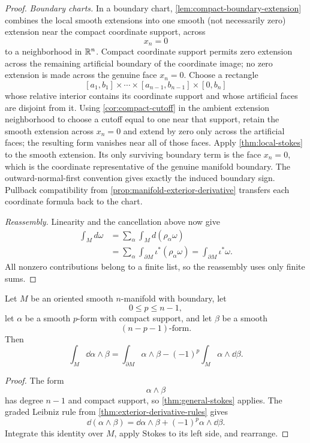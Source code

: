 \begin{proof}
\emph{Boundary charts.} In a boundary chart, \cref{lem:compact-boundary-extension}
combines the local smooth extensions into one smooth (not necessarily zero)
extension near the compact coordinate support, across
\[
x_n=0
\]
to a neighborhood in \(\mathbb{R}^n\).  Compact coordinate support permits zero
extension across the remaining artificial boundary of the coordinate image;
no zero extension is made across the genuine face \(x_n=0\).  Choose a
rectangle
\[
[a_1,b_1]\times\cdots\times[a_{n-1},b_{n-1}]\times[0,b_n]
\]
whose relative interior contains its coordinate support and whose artificial
faces are disjoint from it.  Using \cref{cor:compact-cutoff} in the ambient extension neighborhood to choose a cutoff equal to one near that support,
retain the smooth extension across \(x_n=0\) and extend by zero only across the
artificial faces; the resulting form vanishes near all of those faces.  Apply
\cref{thm:local-stokes} to the smooth extension.  Its only surviving boundary
term is the face \(x_n=0\), which is the coordinate representative of the
genuine manifold boundary.  The outward-normal-first convention gives
exactly the induced boundary sign.  Pullback compatibility
from \cref{prop:manifold-exterior-derivative} transfers each coordinate formula
back to the chart.

\emph{Reassembly.} Linearity and the cancellation above now give
\[
\begin{aligned}
\int_M d\omega
&=\sum_\alpha\int_M d(\rho_\alpha\omega)\\
&=\sum_\alpha\int_{\partial M}\iota^*(\rho_\alpha\omega)
=\int_{\partial M}\iota^*\omega.
\end{aligned}
\]
All nonzero contributions belong to a finite list, so the reassembly uses
only finite sums.
\end{proof}

\begin{corollary}
\label{cor:forms-integration-by-parts}
Let \(M\) be an oriented smooth \(n\)-manifold with boundary, let
\[
0\leq p\leq n-1,
\]
let \(\alpha\) be a smooth \(p\)-form with compact support, and let
\(\beta\) be a smooth
\[
(n-p-1)\text{-form}.
\]
Then
\[
\int_M\dd\alpha\wedge\beta
=
\int_{\partial M}\alpha\wedge\beta
-
(-1)^p\int_M\alpha\wedge\dd\beta.
\]
\end{corollary}
\begin{proof}
The form
\[
\alpha\wedge\beta
\]
has degree \(n-1\) and compact support, so
\cref{thm:general-stokes} applies.  The graded Leibniz rule from
\cref{thm:exterior-derivative-rules} gives
\[
\dd(\alpha\wedge\beta)
=
\dd\alpha\wedge\beta
+
(-1)^p\alpha\wedge\dd\beta.
\]
Integrate this identity over \(M\), apply Stokes to its left side, and
rearrange.
\end{proof}

